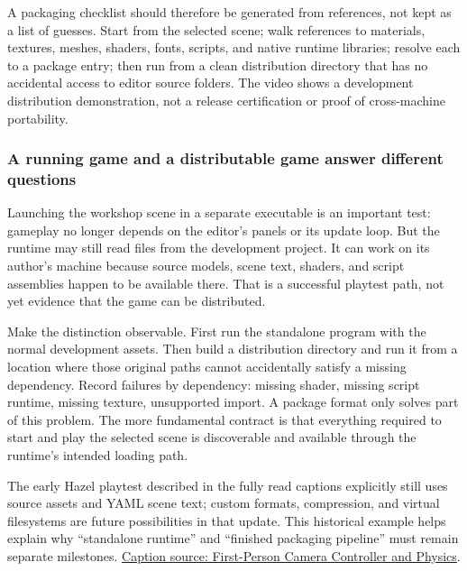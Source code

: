 A packaging checklist should therefore be generated from references, not kept as a list of guesses. Start from the selected scene; walk references to materials, textures, meshes, shaders, fonts, scripts, and native runtime libraries; resolve each to a package entry; then run from a clean distribution directory that has no accidental access to editor source folders. The video shows a development distribution demonstration, not a release certification or proof of cross-machine portability.

\subsubsection{A running game and a distributable game answer different questions}\label{06-engine-ii-ch032-a-running-game-and-a-distributable-game-answer-different-questions}

\hypertarget{06-engine-ii-ch032-a-running-game-and-a-distributable-game-answer-different-questions}{}

Launching the workshop scene in a separate executable is an important test: gameplay no longer depends on the editor's panels or its update loop. But the runtime may still read files from the development project. It can work on its author's machine because source models, scene text, shaders, and script assemblies happen to be available there. That is a successful playtest path, not yet evidence that the game can be distributed.

Make the distinction observable. First run the standalone program with the normal development assets. Then build a distribution directory and run it from a location where those original paths cannot accidentally satisfy a missing dependency. Record failures by dependency: missing shader, missing script runtime, missing texture, unsupported import. A package format only solves part of this problem. The more fundamental contract is that everything required to start and play the selected scene is discoverable and available through the runtime's intended loading path.

The early Hazel playtest described in the fully read captions explicitly still uses source assets and YAML scene text; custom formats, compression, and virtual filesystems are future possibilities in that update. This historical example helps explain why ``standalone runtime'' and ``finished packaging pipeline'' must remain separate milestones. \href{https://www.youtube.com/watch?v=nVZM2zSXaiY}{Caption source: First-Person Camera Controller and Physics}.

